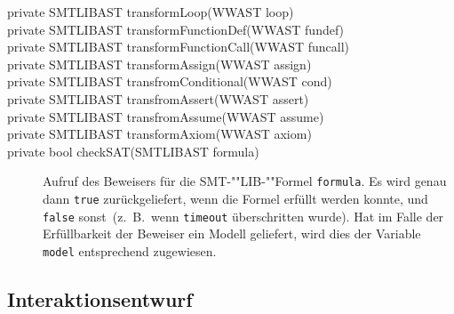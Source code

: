 
\begin{description}%
    \item[private SMTLIBAST transformLoop(WWAST loop)]%

    \item[private SMTLIBAST transformFunctionDef(WWAST fundef)]%

    \item[private SMTLIBAST transformFunctionCall(WWAST funcall)]%

    \item[private SMTLIBAST transformAssign(WWAST assign)]%

    \item[private SMTLIBAST transfromConditional(WWAST cond)]%

    \item[private SMTLIBAST transfromAssert(WWAST assert)]%

    \item[private SMTLIBAST transfromAssume(WWAST assume)]%

    \item[private SMTLIBAST transformAxiom(WWAST axiom)]%

    \item[private bool checkSAT(SMTLIBAST formula)]

    Aufruf des Beweisers für die SMT-""LIB-""Formel \texttt{formula}.
    Es wird genau dann \texttt{true} zurückgeliefert, wenn die Formel
    erfüllt werden konnte, und \texttt{false} sonst~(z.~B.\, wenn
    \texttt{timeout} überschritten wurde). Hat im Falle der
    Erfüllbarkeit der Beweiser ein Modell geliefert, wird dies der
    Variable \texttt{model} entsprechend zugewiesen.%

\end{description}%

\subsection{Interaktionsentwurf}%
